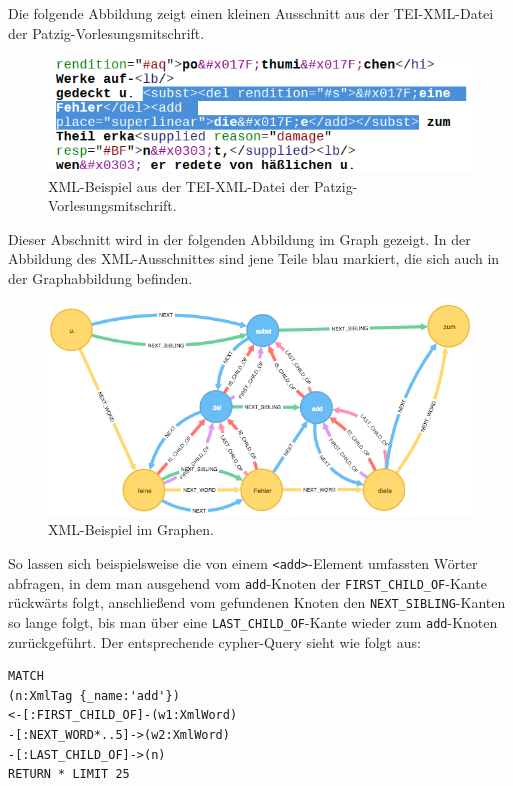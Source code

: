 \documentclass[12pt,ngerman,]{article}
\begin{document}
Die folgende Abbildung zeigt einen kleinen Ausschnitt aus der
TEI-XML-Datei der Patzig-Vorlesungsmitschrift.

\begin{figure}
\centering
\includegraphics{Bilder/TEI2Graph/subst-xml-Beispiel.png}
\caption{XML-Beispiel aus der TEI-XML-Datei der
Patzig-Vorlesungsmitschrift.}
\end{figure}

Dieser Abschnitt wird in der folgenden Abbildung im Graph gezeigt. In
der Abbildung des XML-Ausschnittes sind jene Teile blau markiert, die
sich auch in der Graphabbildung befinden.

\begin{figure}
\centering
\includegraphics{Bilder/TEI2Graph/xml-importer-datenmodell.png}
\caption{XML-Beispiel im Graphen.}
\end{figure}

So lassen sich beispielsweise die von einem
\texttt{\textless{}add\textgreater{}}-Element umfassten Wörter abfragen,
in dem man ausgehend vom \texttt{add}-Knoten der
\texttt{FIRST\_CHILD\_OF}-Kante rückwärts folgt, anschließend vom
gefundenen Knoten den \texttt{NEXT\_SIBLING}-Kanten so lange folgt, bis
man über eine \texttt{LAST\_CHILD\_OF}-Kante wieder zum
\texttt{add}-Knoten zurückgeführt. Der entsprechende cypher-Query sieht
wie folgt aus:

\begin{verbatim}
MATCH
(n:XmlTag {_name:'add'})
<-[:FIRST_CHILD_OF]-(w1:XmlWord)
-[:NEXT_WORD*..5]->(w2:XmlWord)
-[:LAST_CHILD_OF]->(n)
RETURN * LIMIT 25
\end{verbatim}
\end{document}
